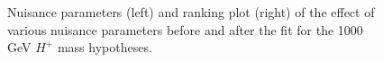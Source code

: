\begin{figure}[H]
  \centering
  \caption{Nuisance parameters (left) and ranking plot (right) of the effect of various nuisance parameters before and after the fit for the 1000 GeV $H^{+}$ mass hypotheses.}
  \label{fig:NuisParAndRanking_Hp1000}
\end{figure}
